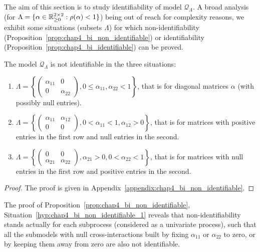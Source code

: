       The aim of this section is to study identifiability of model $\mathcal Q_\Lambda$.
      A broad analysis (\ie for $\Lambda = \{\alpha \in {\mathbb R}_{\geq 0}^{2\times 2} : \rho(\alpha) < 1\}$) being out of reach for complexity reasons,
      we exhibit some situations (\ie subsets $\Lambda$) for which non-identifiability (Proposition~\ref{prop:chap4_bi_non_identifiable}) or identifiability (Proposition~\ref{prop:chap4_bi_identifiable}) can be proved.
      
      \begin{proposition}\label{prop:chap4_bi_non_identifiable}
      	The model $\mathcal Q_\Lambda$ is not identifiable in the three situations:
        \begin{enumerate}
          \item \label{hyp:chap4_bi_non_identifiable_1} $\Lambda = \left\{ \begin{pmatrix} \alpha_{11} & 0 \\ 0 & \alpha_{22} \end{pmatrix}, 0 \le \alpha_{11}, \alpha_{22} < 1 \right\}$, that is for diagonal matrices $\alpha$ (with possibly null entries).
          \item \label{hyp:chap4_bi_non_identifiable_2} $\Lambda = \left\{ \begin{pmatrix} \alpha_{11} & \alpha_{12} \\ 0 & 0 \end{pmatrix}, 0 < \alpha_{11} < 1, \alpha_{12} > 0 \right\}$, that is for matrices with positive entries in the first row and null entries in the second.
          \item \label{hyp:chap4_bi_non_identifiable_2_bis} $\Lambda = \left\{ \begin{pmatrix} 0 & 0 \\ \alpha_{21} & \alpha_{22} \end{pmatrix}, \alpha_{21} > 0, 0 < \alpha_{22} < 1 \right\}$, that is for matrices with null entries in the first row and positive entries in the second.
        \end{enumerate}
      \end{proposition}
      \begin{proof}
      	The proof is given in Appendix~\ref{appendix:chap4_bi_non_identifiable}.
      \end{proof}
      
      \begin{remark} \label{rem:chap4_non_identifiability_submodels}
        The proof of Proposition~\ref{prop:chap4_bi_non_identifiable}, Situation~\ref{hyp:chap4_bi_non_identifiable_1} reveals that non-identifiability stands actually for each subprocess (considered as a univariate process),
        such that all the submodels with null cross-interactions built by fixing $\alpha_{11}$ or $\alpha_{22}$ to zero,
        or by keeping them away from zero are also not identifiable.
      \end{remark}
      
